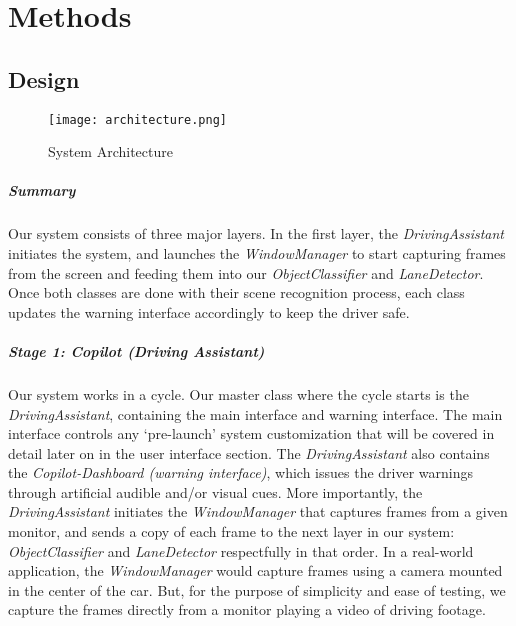 \chapter{Methods}

\section{Design}

\begin{figure}[h]
	\centering
    \texttt{[image: architecture.png]}
    \caption{System Architecture}
\end{figure}

\paragraph{Summary} Our system consists of three major layers. In the first layer, the \textit{DrivingAssistant} initiates the system, and launches the \textit{WindowManager} to start capturing frames from the screen and feeding them into our \textit{ObjectClassifier} and \textit{LaneDetector}. Once both classes are done with their scene recognition process, each class updates the warning interface accordingly to keep the driver safe.  


\paragraph{Stage 1: Copilot (Driving Assistant)} Our system works in a cycle. Our master class where the cycle starts is the \textit{DrivingAssistant}, containing the main interface and warning interface. The main interface controls any `pre-launch' system customization that will be covered in detail later on in the user interface section. The \textit{DrivingAssistant} also contains the \textit{Copilot-Dashboard (warning interface)}, which issues the driver warnings through artificial audible and/or visual cues. More importantly, the \textit{DrivingAssistant} initiates the \textit{WindowManager} that captures frames from a given monitor, and sends a copy of each frame to the next layer in our system: \textit{ObjectClassifier} and \textit{LaneDetector} respectfully in that order. In a real-world application, the \textit{WindowManager} would capture frames using a camera mounted in the center of the car. But, for the purpose of simplicity and ease of testing, we capture the frames directly from a monitor playing a video of driving footage.


